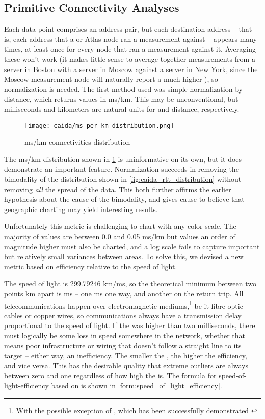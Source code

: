 \subsection{Primitive Connectivity Analyses}

Each data point comprises an \ip address pair, but each destination \ip address -- that is, each \ip address that a \caida or \ripe Atlas node ran a measurement against -- appears many times, at least once for every node that ran a measurement against it. Averaging these won't work (it makes little sense to average together measurements from a server in Boston with a server in Moscow against a server in New York, since the Moscow measurement node will naturally report a much higher \rtt), so normalization is needed. The first method used was simple normalization by distance, which returns values in ms/km. This may be unconventional, but milliseconds and kilometers are natural units for \rtts and distance, respectively.

\begin{figure}[h]
    \centering
    \texttt{[image: caida/ms\_per\_km\_distribution.png]}
    \caption{ms/km connectivities distribution}
    \label{fig:caida_ms_per_km_distribution}
\end{figure}

The ms/km distribution shown in \cref{fig:caida_ms_per_km_distribution} is uninformative on its own, but it does demonstrate an important feature. Normalization succeeds in removing the bimodality of the \rtt distribution shown in \cref{fig:caida_rtt_distribution} without removing \textit{all} the spread of the data. This both further affirms the earlier hypothesis about the cause of the bimodality, and gives cause to believe that geographic charting may yield interesting results.

Unfortunately this metric is challenging to chart with any color scale. The majority of values are between 0.0 and 0.05 ms/km but values an order of magnitude higher must also be charted, and a log scale fails to capture important but relatively small variances between areas. To solve this, we devised a new metric based on efficiency relative to the speed of light.

The speed of light is 299.79246 km/ms, so the theoretical minimum \rtt between two points  km apart is  ms -- one ms one way, and another on the return trip. All telecommunications happen over electromagnetic mediums,\footnote{With the possible exception of \ipaoc, which has been successfully demonstrated \cite{rfc1149, BergenLinuxUserGroup2001a}} be it fibre optic cables or copper wires, so communications always have a transmission delay proportional to the speed of light. If the \rtt was higher than two milliseconds, there must logically be some loss in speed somewhere in the network, whether that means poor infrastructure or wiring that doesn't follow a straight line to its target -- either way, an inefficiency. The smaller the \rtt, the higher the efficiency, and vice versa. This has the desirable quality that extreme outliers are always between zero and one regardless of how high the \rtt is. The formula for speed-of-light-efficiency based on \rtts is shown in \cref{form:speed_of_light_efficiency}.

